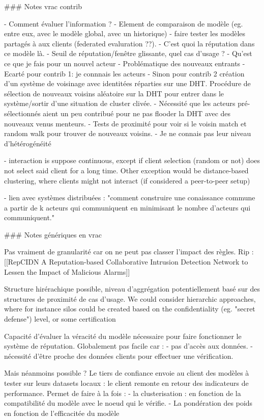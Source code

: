 \documentclass{article}
\begin{document}
\begin{markdown}
### Notes vrac contrib

- Comment évaluer l'information ?
    - Element de comparaison de modèle (eg. entre eux, avec le modèle global, avec un historique)
    - faire tester les modèles partagés à aux clients (federated evaluration ??).
- C'est quoi la réputation dans ce modèle là. 
- Seuil de réputation/fenêtre glissante, quel cas d'usage ? 
- Qu'est ce que je fais pour un nouvel acteur 
	- Problématique des nouveaux entrants 
	- Ecarté pour contrib 1: je connnais les acteurs
	- Sinon pour contrib 2 création d'un système de voisinage avec identitées réparties sur une DHT. Procédure de sélection de nouveaux voisins aléatoire sur la DHT pour entrer dans le système/sortir d'une situation de cluster clivée.
		- Nécessité que les acteurs pré-sélectionnés aient un peu contribué pour ne pas flooder la DHT avec des nouveaux venus menteurs.
	- Tests de proximité pour voir si le voisin match et random walk pour trouver de nouveaux voisins. 
	- Je ne connais pas leur niveau d'hétérogénéité 

- interaction is suppose continuous, except if client selection (random or not) does not select said client for a long time. Other exception would be distance-based clustering, where clients might not interact (if considered a peer-to-peer setup)



- lien avec systèmes distribuées : "comment construire une conaissance commune a partir de k acteurs qui communiquent en minimisant le nombre d'acteurs qui communiquent."


### Notes génériques en vrac

Pas vraiment de granularité car on ne peut pas classer l'impact des règles. 
Rip : [[RepCIDN A Reputation-based Collaborative Intrusion Detection Network to Lessen the Impact of Malicious Alarms]]

Structure hirérachique possible, niveau d'aggrégation potentiellement basé sur des structures de proximité de cas d'usage.
We could consider hierarchic approaches, where for instance silos could be created based on the confidentiality (eg. "secret defense") level, or some certification


Capacité d'évaluer la véracité du modèle nécessaire pour faire fonctionner le système de réputation. Globalement pas facile car  :
- pas d'accès aux données.
- nécessité d'être proche des données clients pour effectuer une vérification. 

Mais néanmoins possible ? 
Le tiers de confiance envoie au client des modèles à tester sur leurs datasets locaux : le client remonte en retour des indicateurs de performance. Permet de faire à la fois :
    - la clusterisation : en fonction de la compatibilité du modèle avec le noeud qui le vérifie.
    - La pondération des poids en fonction de l'efficacitée du modèle


\end{markdown}
\end{document}
